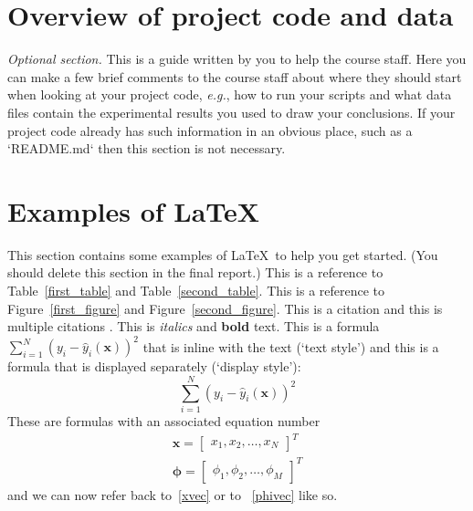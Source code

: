 \documentclass[10pt,twocolumn,letterpaper]{article}
\begin{document}
\section{Overview of project code and data}

{\em Optional section.} This is a guide written by you to help the course staff.
Here you can make a few brief comments to the course staff about where
they should start when looking at your project code, {\em e.g.}, how to run your scripts and what
data files contain the experimental results you used to draw your conclusions.
If your project code already has such information in an obvious place, such as a `README.md`
then this section is not necessary.

\section{Examples of \LaTeX}


This section contains some examples of \LaTeX~to help you get started.
(You should delete this section in the final report.)
This is a reference to Table~\ref{first_table} and Table~\ref{second_table}.
This is a reference to Figure~\ref{first_figure} and Figure~\ref{second_figure}.
This is a citation \cite{breiman2001statistical} and this is
multiple citations \cite{breiman2001statistical,bishop2006pattern}.
This is \textit{italics} and \textbf{bold} text.
This is a formula $\sum_{i=1}^N (y_i - \hat{y}_i(\mathbf{x}))^2$
that is inline with the text (`text style') and this is a
formula that is displayed separately (`display style'):
$$
\sum_{i=1}^N (y_i - \hat{y}_i(\mathbf{x}))^2
$$
These are formulas with an associated equation number
\begin{align}
   \mathbf{x} = \begin{bmatrix}
      x_1, x_2, \ldots, x_N
   \end{bmatrix}^T    \label{xvec}\\
   \boldsymbol{\phi} = \begin{bmatrix}
      \phi_1, \phi_2, \ldots, \phi_M
   \end{bmatrix}^T    \label{phivec}
\end{align}
and we can now refer back to~\eqref{xvec} or to ~\eqref{phivec} like so.
\end{document}
